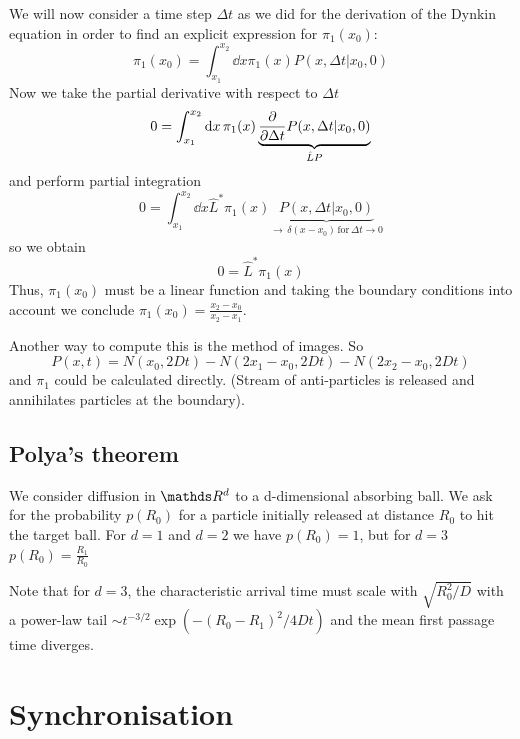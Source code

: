 \documentclass{/home/ben/Templates/notebook}
\begin{document}
	We will now consider a time step $\Delta t$ as we did for the derivation of the Dynkin equation in order to find an explicit expression for $\pi_1(x_0)$:
	\begin{equation*}
		\pi_1(x_0) = \int_{x_1}^{x_2} \dd{x} \pi_1(x) P(x, \Delta t | x_0, 0)
	\end{equation*}
	Now we take the partial derivative with respect to $\Delta t$ 
	\begin{equation*}
		0 = \int_{x_1}^{x_2} \dd{x} \pi_1(x) \underbrace{\pdv{\Delta t} P(x, \Delta t | x_0, 0)}_{\hat{L} P}
	\end{equation*}
	and perform partial integration
	\begin{equation*}
		0 = \int_{x_1}^{x_2} \dd{x} \hat{L}^* \pi_1(x) \underbrace{P(x, \Delta t | x_0, 0)}_{\to \, \delta(x-x_0) \, \mathrm{for} \, \Delta t \to 0}
	\end{equation*}
	so we obtain
	\begin{equation*}
		0 = \hat{L}^* \pi_1(x)
	\end{equation*}
	Thus, $\pi_1(x_0)$ must be a linear function and taking the boundary conditions into account we conclude $\pi_1(x_0) = \frac{x_2-x_0}{x_2-x_1}$.
	
	Another way to compute this is the method of images. So 
	\begin{equation}
	P(x,t) = N(x_0, 2Dt) - N(2x_1-x_0, 2Dt) - N(2x_2 - x_0, 2Dt)
	\end{equation}
	and $\pi_1$ could be calculated directly. (Stream of anti-particles is released and annihilates particles at the boundary).
	
	\section{Polya's theorem}
	
	We consider diffusion in $\R^d$ to a d-dimensional absorbing ball. We ask for the probability $p(R_0)$ for a particle initially released at distance $R_0$ to hit the target ball. For $d = 1$ and $d = 2$ we have $p(R_0) = 1$, but for $d = 3$ $p(R_0) = \frac{R_1}{R_0}$
	
	Note that for $d = 3$, the characteristic arrival time must scale with $\sqrt{R^2_0/D}$ with a power-law tail $\sim t^{-3/2} \exp(- (R_0-R_1)^2/4 D t)$ and the mean first passage time diverges.
	
	\chapter{Synchronisation}
	
\end{document}
